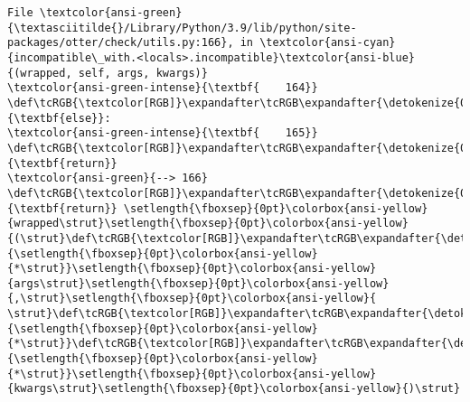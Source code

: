 \documentclass[11pt]{article}
\begin{document}
\begin{Verbatim}[commandchars=\\\{\}, frame=single, framerule=2mm, rulecolor=\color{outerrorbackground}]
File \textcolor{ansi-green}{\textasciitilde{}/Library/Python/3.9/lib/python/site-packages/otter/check/utils.py:166}, in \textcolor{ansi-cyan}{incompatible\_with.<locals>.incompatible}\textcolor{ansi-blue}{(wrapped, self, args, kwargs)}
\textcolor{ansi-green-intense}{\textbf{    164}}     \def\tcRGB{\textcolor[RGB]}\expandafter\tcRGB\expandafter{\detokenize{0,135,0}}{\textbf{else}}:
\textcolor{ansi-green-intense}{\textbf{    165}}         \def\tcRGB{\textcolor[RGB]}\expandafter\tcRGB\expandafter{\detokenize{0,135,0}}{\textbf{return}}
\textcolor{ansi-green}{--> 166} \def\tcRGB{\textcolor[RGB]}\expandafter\tcRGB\expandafter{\detokenize{0,135,0}}{\textbf{return}} \setlength{\fboxsep}{0pt}\colorbox{ansi-yellow}{wrapped\strut}\setlength{\fboxsep}{0pt}\colorbox{ansi-yellow}{(\strut}\def\tcRGB{\textcolor[RGB]}\expandafter\tcRGB\expandafter{\detokenize{98,98,98}}{\setlength{\fboxsep}{0pt}\colorbox{ansi-yellow}{*\strut}}\setlength{\fboxsep}{0pt}\colorbox{ansi-yellow}{args\strut}\setlength{\fboxsep}{0pt}\colorbox{ansi-yellow}{,\strut}\setlength{\fboxsep}{0pt}\colorbox{ansi-yellow}{ \strut}\def\tcRGB{\textcolor[RGB]}\expandafter\tcRGB\expandafter{\detokenize{98,98,98}}{\setlength{\fboxsep}{0pt}\colorbox{ansi-yellow}{*\strut}}\def\tcRGB{\textcolor[RGB]}\expandafter\tcRGB\expandafter{\detokenize{98,98,98}}{\setlength{\fboxsep}{0pt}\colorbox{ansi-yellow}{*\strut}}\setlength{\fboxsep}{0pt}\colorbox{ansi-yellow}{kwargs\strut}\setlength{\fboxsep}{0pt}\colorbox{ansi-yellow}{)\strut}


\end{Verbatim}
\end{document}
